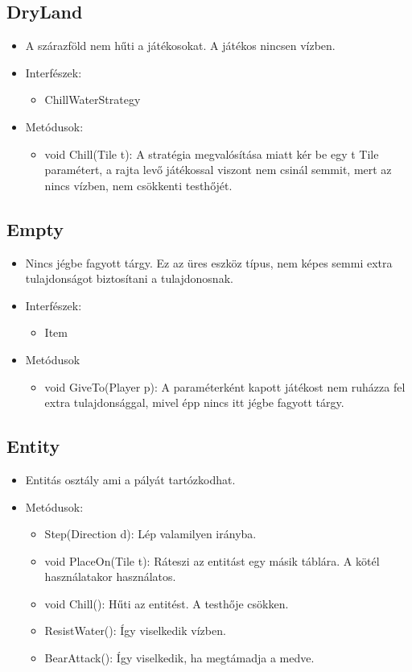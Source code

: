 \subsection{DryLand}
\begin{itemize}
	\item A szárazföld nem hűti a játékosokat. A játékos nincsen vízben.
	\item Interfészek:
	\begin{itemize}
		\item ChillWaterStrategy
	\end{itemize}
	\item Metódusok:
	\begin{itemize}
		\item void Chill(Tile t): A stratégia megvalósítása miatt kér be egy t Tile paramétert, a rajta levő játékossal viszont nem csinál semmit, mert az nincs vízben, nem csökkenti testhőjét.
	\end{itemize}
\end{itemize}

\subsection{Empty}
\begin{itemize}
	\item Nincs jégbe fagyott tárgy. Ez az üres eszköz típus, nem képes semmi extra tulajdonságot biztosítani a tulajdonosnak.
	\item Interfészek:
	\begin{itemize}
		\item Item
	\end{itemize}
	\item Metódusok
	\begin{itemize}
		\item void GiveTo(Player p): A paraméterként kapott játékost nem ruházza fel extra tulajdonsággal, mivel épp nincs itt jégbe fagyott tárgy.
	\end{itemize}
\end{itemize}

\subsection{Entity}
\begin{itemize}
	\item Entitás osztály ami a pályát tartózkodhat.
	\item Metódusok:
	\begin{itemize}
		\item Step(Direction d): Lép valamilyen irányba.
		\item void PlaceOn(Tile t): Ráteszi az entitást egy másik táblára. A kötél használatakor használatos.
		\item void Chill(): Hűti az entitést. A testhője csökken.
		\item ResistWater(): Így viselkedik vízben.
		\item BearAttack(): Így viselkedik, ha megtámadja a medve.
	\end{itemize}
\end{itemize}

